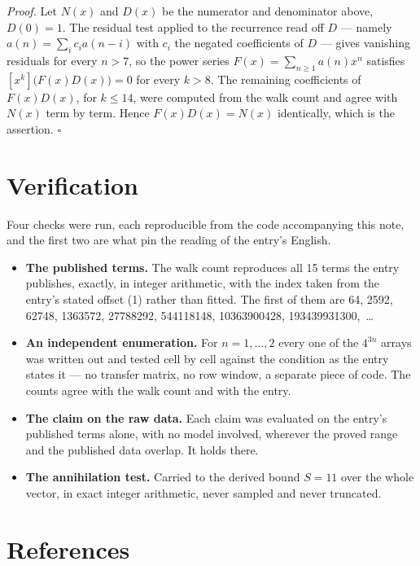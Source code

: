 \documentclass[11pt]{article}
\theoremstyle{definition}
\begin{document}
{\itshape Proof.} Let $N(x)$ and $D(x)$ be the numerator and denominator above, $D(0)=1$. The residual test applied to the recurrence read off $D$ --- namely $a(n) = \sum_i c_i a(n-i)$ with $c_i$ the negated coefficients of $D$ --- gives vanishing residuals for every $n > 7$, so the power series $F(x)=\sum_{n\ge 1}a(n)x^n$ satisfies $[x^k]\bigl(F(x)D(x)\bigr) = 0$ for every $k > 8$. The remaining coefficients of $F(x)D(x)$, for $k \le 14$, were computed from the walk count and agree with $N(x)$ term by term. Hence $F(x)D(x) = N(x)$ identically, which is the assertion. $\square$

\section{Verification}

Four checks were run, each reproducible from the code accompanying this note, and the first two are what pin the reading of the entry's English.

\begin{itemize}

\item {\bfseries The published terms.} The walk count reproduces all 15 terms the entry publishes, exactly, in integer arithmetic, with the index taken from the entry's stated offset (1) rather than fitted. The first of them are 64, 2592, 62748, 1363572, 27788292, 544118148, 10363900428, 193439931300,~\dots

\item {\bfseries An independent enumeration.} For $n = 1,\dots,2$ every one of the $4^{3n}$ arrays was written out and tested cell by cell against the condition as the entry states it --- no transfer matrix, no row window, a separate piece of code. The counts agree with the walk count and with the entry.

\item {\bfseries The claim on the raw data.} Each claim was evaluated on the entry's published terms alone, with no model involved, wherever the proved range and the published data overlap. It holds there.

\item {\bfseries The annihilation test.} Carried to the derived bound $S = 11$ over the whole vector, in exact integer arithmetic, never sampled and never truncated.

\end{itemize}

\section{References}
\end{document}
